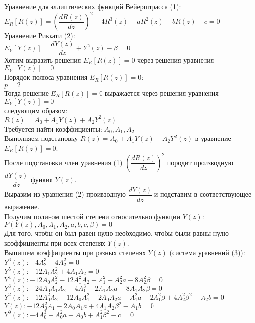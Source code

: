 \documentclass[12pt,a4paper,draft]{letter}
\begin{document}
\onehalfspacing
Уравнение для эллиптических функций Вейерштрасса (1):
\\
$E_R [R(z)] = \left(\dfrac{dR(z)}{dz}\right)^2 - 4R^3(z) - aR^2(z) - bR(z) - c = 0$
\\
Уравнение Риккати (2):
\\
$E_Y [Y(z)] = \dfrac{dY(z)}{dz} + Y^2(z) - \beta = 0$
\\
Хотим выразить решения $E_R [R(z)] = 0$ через решения уравнения $E_Y [Y(z)] = 0$
\\
Порядок полюса уравнения $E_R [R(z)] = 0$:
\\
$p = 2$
\\
Тогда решение $E_R [R(z)] = 0$ выражается через решения уравнения $E_Y [Y(z)] = 0$
\\
следующим образом:
\\
$R(z) = A_0 + A_1 Y(z) + A_2 Y^2(z)$
\\
Требуется найти коэффициенты: $A_0, A_1, A_2$
\\
Выполняем подстановку $R(z) = A_0 + A_1 Y(z) + A_2 Y^2(z)$ в уравнение $E_R [R(z)] = 0$.
\\
После подстановки член уравнения (1) $\left(\dfrac{dR(z)}{dz}\right)^2$ породит производную $ \dfrac{dY(z)}{dz}$ функии $Y(z)$.
\\
Выразим из уравнения (2) проивзодную $ \dfrac{dY(z)}{dz}$ и подставим в соответствующее выражение.
\\
Получим полином шестой степени относительно функции $Y(z)$:
\\
$P(Y(z), A_0, A_1, A_2, a, b, c, \beta) = 0$
\\
Для того, чтобы он был равен нулю необходимо, чтобы были равны нулю коэффициенты при всех степенях $Y(z)$.
\\
Выпишем коэффициенты при разных степенях $Y(z)$ (система уравнений (3)):
\\
$Y^6(z): -4A_2^3 + 4A_2^2 = 0$ \\
$Y^5(z): -12A_1 A_2^2 + 4A_1 A_2 = 0$ \\
$Y^4(z): -12 A_0 A_2^2 - 12 A_1^2 A_2 + A_1^2 - A_2^2 a - 8 A_2^2 \beta = 0$ \\
$Y^3(z):  -24 A_0 A_1 A_2 - 4 A_1^3 - 2 A_1 A_2 a - 8 A_1 A_2 \beta = 0$ \\
$Y^2(z):  -12 A_0^2 A_2 - 12 A_0 A_1^2 - 2 A_0 A_2 a - A_1^2 a - 2 A_1^2 \beta + 4 A_2^2 \beta^2 - A_2 b = 0$ \\
$Y(z):  -12 A_0^2 A_1 - 2 A_0 A_1 a + 4 A_1 A_2 \beta^2 - A_1 b = 0$ \\
$Y^0(z):  -4 A_0^3 - A_0^2 a - A_0 b + A_1^2 \beta^2 - c = 0$ \\
\end{document}
